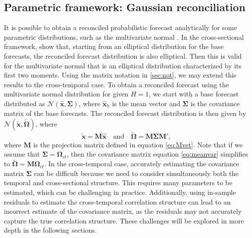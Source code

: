 \documentclass[a4paper,11pt]{article}
\newcommand{\xvet}{\bm{x}}
\newcommand{\Mvet}{\bm{M}}
\newcommand{\Omegavet}{\bm{\Omega}}
\newcommand{\Sigmavet}{\bm{\Sigma}}
\theoremstyle{definition}
\begin{document}
\subsection{Parametric framework: Gaussian reconciliation}\label{ssec:prob_pf}
It is possible to obtain a reconciled probabilistic forecast analytically for some parametric distributions, such as the multivariate normal \citep{panagiotelis2023, wickramasuriya2021b, corani2021, eckert2021}. In the cross-sectional framework, \cite{panagiotelis2023} show that, starting from an elliptical distribution for the base forecasts, the reconciled forecast distribution is also elliptical. Then this is valid for the multivariate normal that is an elliptical distribution characterized by its first two moments. Using the matrix notation in \autoref{sec:not}, we may extend this results to the cross-temporal case.
To obtain a reconciled forecast using the multivariate normal distribution for given  $H = 1$, we start with a base forecast distributed as $\mathcal{N}(\widehat{\xvet}, \Sigmavet)$, where $\widehat{\xvet}_h$ is the mean vector and $\Sigmavet$ is the covariance matrix of the base forecasts. The reconciled forecast distribution is then given by $\mathcal{N}(\widetilde{\xvet}, \widetilde{\Omegavet})$, where
\begin{equation}\label{eq:meanvar}
	\widetilde{\xvet} = \Mvet\widehat{\xvet} \quad \mbox{and} \quad \widetilde{\Omegavet} = \Mvet \Sigmavet \Mvet',
\end{equation}
where $\Mvet$ is the projection matrix defined in equation \eqref{eq:Mvet}.
Note that if we assume that $\Sigmavet = \Omegavet_{ct}$, then the covariance matrix equation \eqref{eq:meanvar} simplifies to $\widetilde{\Omegavet} = \Mvet \Omegavet_{ct}$.
In the cross-temporal case, accurately estimating the covariance matrix $\Sigmavet$ can be difficult because we need to consider simultaneously both the temporal and cross-sectional structure. This requires many parameters to be estimated, which can be challenging in practice. Additionally, using in-sample residuals to estimate the cross-temporal correlation structure can lead to an incorrect estimate of the covariance matrix, as the residuals may not accurately capture the true correlation structure. These challenges will be explored in more depth in the following sections.
\end{document}
